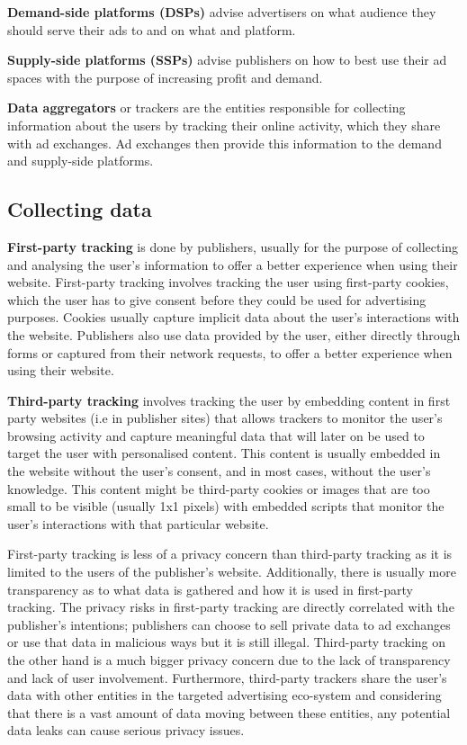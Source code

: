 \documentclass{l4proj}
\begin{document}
\textbf{Demand-side platforms (DSPs)} advise advertisers on what audience they should serve their ads to and on what and platform. 

\textbf{Supply-side platforms (SSPs)} advise publishers on how to best use their ad spaces with the purpose of increasing profit and demand. 

\textbf{Data aggregators} or trackers are the entities responsible for collecting information about the users by tracking their online activity, which they share with ad exchanges. Ad exchanges then provide this information to the demand and supply-side platforms.

\subsection{Collecting data}
\textbf{First-party tracking} is done by publishers, usually for the purpose of collecting and analysing the user's information to offer a better experience when using their website. First-party tracking involves tracking the user using first-party cookies, which the user has to give consent before they could be used for advertising purposes. Cookies usually capture implicit data about the user's interactions with the website. Publishers also use data provided by the user, either directly through forms or captured from their network requests, to offer a better experience when using their website.  

\textbf{Third-party tracking} involves tracking the user by embedding content in first party websites (i.e in publisher sites) that allows trackers to monitor the user's browsing activity and capture meaningful data that will later on be used to target the user with personalised content. This content is usually embedded in the website without the user's consent, and in most cases, without the user's knowledge. This content might be third-party cookies or images that are too small to be visible (usually 1x1 pixels) with embedded scripts that monitor the user's interactions with that particular website.

First-party tracking is less of a privacy concern than third-party tracking as it is limited to the users of the publisher's website. Additionally, there is usually more transparency as to what data is gathered and how it is used in first-party tracking. The privacy risks in first-party tracking are directly correlated with the publisher's intentions; publishers can choose to sell private data to ad exchanges or use that data in malicious ways but it is still illegal. Third-party tracking on the other hand is a much bigger privacy concern due to the lack of transparency and lack of user involvement. Furthermore, third-party trackers share the user's data with other entities in the targeted advertising eco-system and considering that there is a vast amount of data moving between these entities, any potential data leaks can cause serious privacy issues. 
\end{document}
